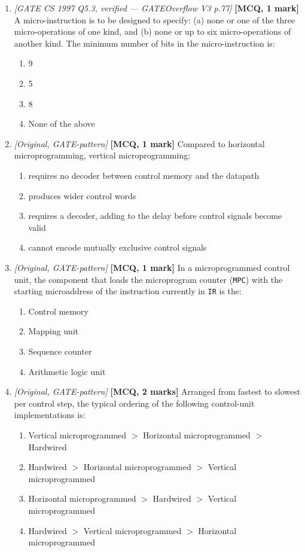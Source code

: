 \documentclass[11pt]{article}
\begin{document}
\begin{enumerate}
\item[\textbf{Q4}] \textit{[GATE CS 1997 Q5.3, verified --- GATEOverflow V3 p.77]} \textbf{[MCQ, 1 mark]} A micro-instruction is to be designed to specify: (a) none or one of the three micro-operations of one kind, and (b) none or up to six micro-operations of another kind. The minimum number of bits in the micro-instruction is:
\begin{enumerate}
  \item[(A)] 9
  \item[(B)] 5
  \item[(C)] 8
  \item[(D)] None of the above
\end{enumerate}

\item[\textbf{Q5}] \textit{[Original, GATE-pattern]} \textbf{[MCQ, 1 mark]} Compared to horizontal microprogramming, vertical microprogramming:
\begin{enumerate}
  \item[(A)] requires no decoder between control memory and the datapath
  \item[(B)] produces wider control words
  \item[(C)] requires a decoder, adding to the delay before control signals become valid
  \item[(D)] cannot encode mutually exclusive control signals
\end{enumerate}

\item[\textbf{Q6}] \textit{[Original, GATE-pattern]} \textbf{[MCQ, 1 mark]} In a microprogrammed control unit, the component that loads the microprogram counter (\texttt{MPC}) with the starting microaddress of the instruction currently in \texttt{IR} is the:
\begin{enumerate}
  \item[(A)] Control memory
  \item[(B)] Mapping unit
  \item[(C)] Sequence counter
  \item[(D)] Arithmetic logic unit
\end{enumerate}

\item[\textbf{Q7}] \textit{[Original, GATE-pattern]} \textbf{[MCQ, 2 marks]} Arranged from fastest to slowest per control step, the typical ordering of the following control-unit implementations is:
\begin{enumerate}
  \item[(A)] Vertical microprogrammed $>$ Horizontal microprogrammed $>$ Hardwired
  \item[(B)] Hardwired $>$ Horizontal microprogrammed $>$ Vertical microprogrammed
  \item[(C)] Horizontal microprogrammed $>$ Hardwired $>$ Vertical microprogrammed
  \item[(D)] Hardwired $>$ Vertical microprogrammed $>$ Horizontal microprogrammed
\end{enumerate}

\end{enumerate}
\end{document}
